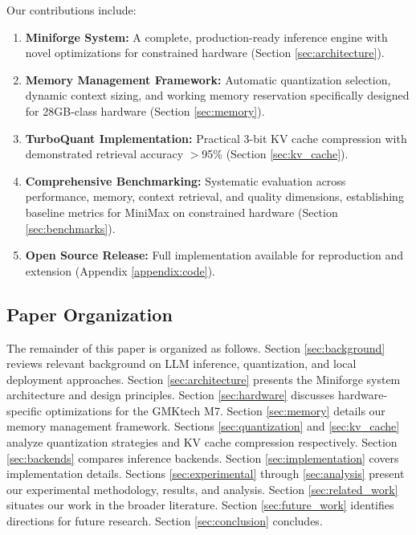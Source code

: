 Our contributions include:

\begin{enumerate}
    \item \textbf{Miniforge System:} A complete, production-ready inference engine with novel optimizations for constrained hardware (Section \ref{sec:architecture}).
    
    \item \textbf{Memory Management Framework:} Automatic quantization selection, dynamic context sizing, and working memory reservation specifically designed for 28GB-class hardware (Section \ref{sec:memory}).
    
    \item \textbf{TurboQuant Implementation:} Practical 3-bit KV cache compression with demonstrated retrieval accuracy $>$95\% (Section \ref{sec:kv_cache}).
    
    \item \textbf{Comprehensive Benchmarking:} Systematic evaluation across performance, memory, context retrieval, and quality dimensions, establishing baseline metrics for MiniMax on constrained hardware (Section \ref{sec:benchmarks}).
    
    \item \textbf{Open Source Release:} Full implementation available for reproduction and extension (Appendix \ref{appendix:code}).
\end{enumerate}

\subsection{Paper Organization}

The remainder of this paper is organized as follows. Section \ref{sec:background} reviews relevant background on LLM inference, quantization, and local deployment approaches. Section \ref{sec:architecture} presents the Miniforge system architecture and design principles. Section \ref{sec:hardware} discusses hardware-specific optimizations for the GMKtech M7. Section \ref{sec:memory} details our memory management framework. Sections \ref{sec:quantization} and \ref{sec:kv_cache} analyze quantization strategies and KV cache compression respectively. Section \ref{sec:backends} compares inference backends. Section \ref{sec:implementation} covers implementation details. Sections \ref{sec:experimental} through \ref{sec:analysis} present our experimental methodology, results, and analysis. Section \ref{sec:related_work} situates our work in the broader literature. Section \ref{sec:future_work} identifies directions for future research. Section \ref{sec:conclusion} concludes.

